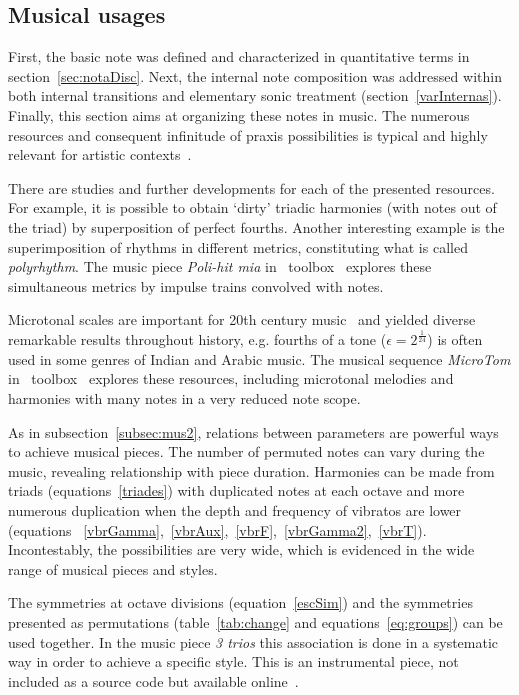\subsection{Musical usages}\label{subsec:usosmusicais3}
First, the basic note was defined and characterized in quantitative terms in section~\ref{sec:notaDisc}.
Next, the internal note
composition was addressed within both internal transitions and elementary sonic treatment
(section~\ref{varInternas}). Finally, this section aims at organizing these notes in music. The numerous resources and consequent infinitude
of praxis possibilities is typical and highly relevant for artistic contexts~\cite{Harmonia,Webern}.

There are studies and further developments for each of the presented resources.
For example, it is possible to obtain `dirty' triadic harmonies (with notes out of the triad) by superposition of perfect fourths.
Another interesting example is the superimposition of rhythms in different metrics, constituting what is
called \emph{polyrhythm}. The music piece \emph{Poli-hit mia} in \massa\ toolbox~\cite{MASSA} explores these simultaneous metrics by impulse trains convolved with notes.

Microtonal scales are important for 20th
century music~\cite{microtonalidade} and yielded diverse remarkable results throughout history, e.g.
fourths of a tone ($\epsilon=2^{\frac{1}{24}}$) is often used in some genres of Indian and Arabic music. The musical sequence \emph{MicroTom} in \massa\ toolbox~\cite{MASSA} explores these resources, including microtonal melodies and harmonies
with many notes in a very reduced note scope.

As in subsection~\ref{subsec:mus2}, relations between
parameters are powerful ways to achieve musical pieces.
The number of permuted
notes can vary during the music, revealing relationship with piece
duration. Harmonies can be made from triads (equations~\ref{triades}) with duplicated
notes at each octave and more numerous duplication when the depth and frequency of
vibratos are lower (equations ~\ref{vbrGamma},~\ref{vbrAux},~\ref{vbrF},~\ref{vbrGamma2},~\ref{vbrT}).
Incontestably, the possibilities are very wide, which is evidenced in the wide range of musical pieces and styles.

The symmetries at octave divisions (equation~\ref{escSim}) and the
symmetries presented as permutations (table~\ref{tab:change} and
equations~\ref{eq:groups}) can be used together. In the music piece \emph{3 trios}
this association is done in a systematic way in order to achieve a specific style. This is an instrumental piece, not included as a source
code but available online~\cite{3Trios}.

